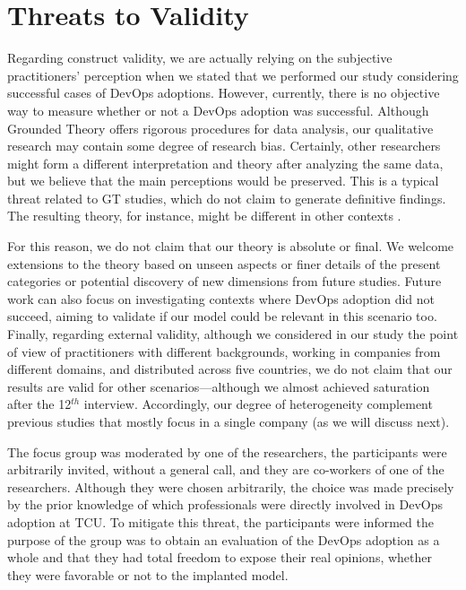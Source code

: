 \section{Threats to Validity}\label{sec:threats}

Regarding construct validity,  we are actually relying on the subjective
practitioners' perception when we stated that we performed our study considering successful cases
of DevOps adoptions. However, currently, there is no objective way to measure whether or not a
DevOps adoption was successful.
Although Grounded Theory offers rigorous procedures for data analysis, our
qualitative research may contain some degree of research bias. Certainly, other
researchers might form a different interpretation and theory after analyzing
the same data, but we believe that the main perceptions would be preserved.
This is a typical threat related to GT studies, which do not claim to generate
definitive findings. The resulting theory, for instance, might
be different in other contexts \cite{hoda2012developing}.

For this reason, we do not claim
that our theory is absolute or final. We welcome extensions to the theory based
on unseen aspects or finer details of the present categories or potential discovery
of new dimensions from future studies.
Future work can also focus on investigating contexts
where DevOps adoption did not succeed, aiming to validate if our model could be
relevant in this scenario too. Finally, regarding external validity, although we
considered in our study the point of view of practitioners with different
backgrounds, working in companies from different domains, and distributed across
five countries, we do not claim that our results are valid for
other scenarios---although we almost achieved saturation
after the 12$^{th}$ interview. Accordingly, our degree of heterogeneity complement
previous studies that mostly focus in a single company (as we will discuss next).

The focus group was moderated by one of the researchers, the participants were
arbitrarily invited, without a general call, and they are co-workers of one of
the researchers. Although they were chosen arbitrarily, the choice was made
precisely by the prior knowledge of which professionals were directly involved
in DevOps adoption at TCU. To mitigate this threat, the participants were
informed the purpose of the group was to obtain an evaluation of the DevOps
adoption as a whole and that they had total freedom to expose their real
opinions, whether they were favorable or not to the implanted model.
